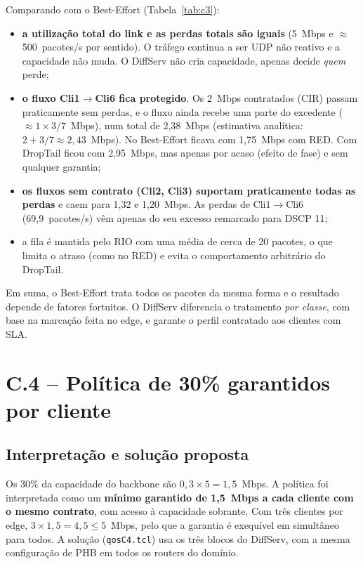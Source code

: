 \IfFileExists{llncs.cls}{\documentclass[runningheads]{llncs}}{\documentclass{article}}
\newcommand{\esp}[1]{#1}
\begin{document}
Comparando com o Best-Effort (Tabela~\ref{tab:c3}):
\begin{itemize}
\item \textbf{a utilização total do link e as perdas totais são iguais} (5~Mbps e
$\approx$500~pacotes/s por sentido). O tráfego continua a ser UDP não reativo e a capacidade
não muda. O DiffServ não cria capacidade, apenas decide \emph{quem} perde;
\item \textbf{o fluxo Cli1$\rightarrow$Cli6 fica protegido}. Os 2~Mbps contratados (CIR)
passam praticamente sem perdas, e o fluxo ainda recebe uma parte do excedente
($\approx 1\times 3/7$~Mbps), num total de \esp{2,38~Mbps} (estimativa analítica: $2+3/7\approx2{,}43$~Mbps). No
Best-Effort ficava com 1,75~Mbps com RED. Com DropTail ficou com 2,95~Mbps, mas apenas por
acaso (efeito de fase) e sem qualquer garantia;
\item \textbf{os fluxos sem contrato (Cli2, Cli3) suportam praticamente todas as perdas} e
caem para \esp{1,32 e 1,20~Mbps}. As perdas de Cli1$\rightarrow$Cli6 (\esp{69,9~pacotes/s})
vêm apenas do seu excesso remarcado para DSCP 11;
\item a fila é mantida pelo RIO com uma média de cerca de 20 pacotes, o que limita o atraso
(como no RED) e evita o comportamento arbitrário do DropTail.
\end{itemize}
Em suma, o Best-Effort trata todos os pacotes da mesma forma e o resultado depende de
fatores fortuitos. O DiffServ diferencia o tratamento \emph{por classe}, com base na
marcação feita no edge, e garante o perfil contratado aos clientes com SLA.

\section{C.4 -- Política de 30\% garantidos por cliente}

\subsection{Interpretação e solução proposta}
Os 30\% da capacidade do backbone são $0{,}3\times5=1{,}5$~Mbps. A política foi interpretada
como um \textbf{mínimo garantido de 1,5~Mbps a cada cliente com o mesmo contrato}, com acesso
à capacidade sobrante. Com três clientes por edge, $3\times1{,}5=4{,}5\le5$~Mbps, pelo que a
garantia é exequível em simultâneo para todos. A solução (\texttt{qosC4.tcl}) usa os três
blocos do DiffServ, com a mesma configuração de PHB em todos os routers do domínio.
\end{document}
